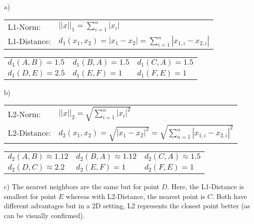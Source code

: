 %
%
%
%
\begin{flushleft}a)\end{flushleft}
\begin{table}[!h]
\begin{tabular}{ll}
  L1-Norm: & $||x||_1 = \sum_{i=1}^n |x_i|$ \\
  L1-Distance: & $d_1(x_1,x_2) = |x_1 - x_2| = \sum_{i=1}^n |x_{1,i} - x_{2,i}|$ 
\end{tabular}
\end{table}
\begin{table}[!h]
\begin{tabular}{lll}
  $d_1(A,B) = 1.5$ & $d_1(B,A) = 1.5$ & $d_1(C,A) = 1.5$ \\
  $d_1(D,E) = 2.5$ & $d_1(E,F) = 1$ & $d_1(F,E) = 1$
\end{tabular}
\end{table}
%
\begin{flushleft}b)\end{flushleft}
\begin{table}[!h]
\begin{tabular}{ll}
  L2-Norm: & $||x||_2 = \sqrt{\sum_{i=1}^n |x_i|^2}$ \\
  L2-Distance: & $d_2(x_1,x_2) = \sqrt{|x_1-x_2|^2} = \sqrt{\sum_{n=1}^n |x_{1,i} - x_{2,i}|^2} $
\end{tabular}
\end{table}
\begin{table}[!h]
\begin{tabular}{lll}
  $d_2(A,B) \approx 1.12$ & $d_2(B,A) \approx 1.12$ & $d_2(C,A) \approx 1.5$ \\
  $d_2(D,C) \approx 2.2$ & $d_2(E,F) = 1$ & $d_2(F,E) = 1$ 
\end{tabular}
\end{table}
\newpage
%
\begin{flushleft}
c) The nearest neighbors are the same but for point $D$. Here, the L1-Distance is smallest for point $E$ whereas with L2-Distance, the nearest point is $C$. Both have different advantages but in a 2D setting, L2 represents the closest point better (as can be visually confirmed).
\end{flushleft}

